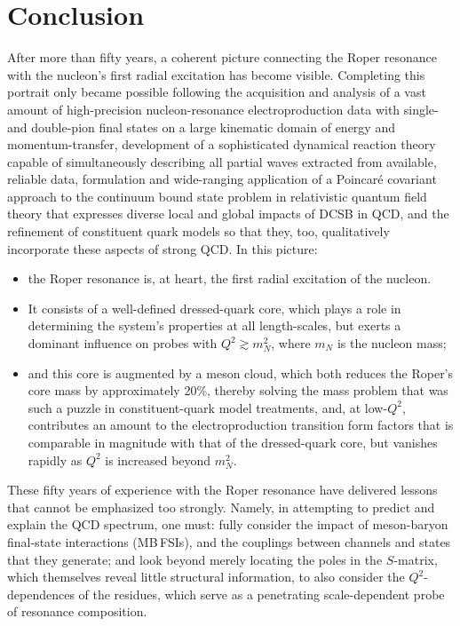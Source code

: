 \section{Conclusion}
%
After more than fifty years, a coherent picture connecting the Roper resonance with the nucleon's first radial excitation has become visible.  Completing this portrait only became possible following
%
the acquisition and analysis of a vast amount of high-precision nucleon-resonance electroproduction data with single- and double-pion final states on a large kinematic domain of energy and momentum-transfer,
%
development of a sophisticated dynamical reaction theory capable of simultaneously describing all partial waves extracted from available, reliable data,
%
formulation and wide-ranging application of a Poincar\'e covariant approach to the continuum bound state problem in relativistic quantum field theory that expresses diverse local and global impacts of DCSB in QCD,
%
and the refinement of constituent quark models so that they, too, qualitatively incorporate these aspects of strong QCD.
%
In this picture:
\begin{itemize}
\setlength\itemsep{0em}
\item the Roper resonance is, at heart, the first radial excitation of the nucleon.
\item It consists of a well-defined dressed-quark core, which plays a role in determining the system's properties at all length-scales, but exerts a dominant influence on probes with $Q^2\gtrsim m_N^2$, where $m_N$ is the nucleon mass;
\item and this core is augmented by a meson cloud, which both reduces the Roper's core mass by approximately 20\%, thereby solving the mass problem that was such a puzzle in constituent-quark model treatments, and, at low-$Q^2$, contributes an amount to the electroproduction transition form factors that is comparable in magnitude with that of the dressed-quark core, but vanishes rapidly as $Q^2$ is increased beyond $m_N^2$.
\end{itemize}

These fifty years of experience with the Roper resonance have delivered lessons that cannot be emphasized too strongly. Namely, in attempting to predict and explain the QCD spectrum, one must: fully consider the impact of meson-baryon final-state interactions (MB\,FSIs), and the couplings between channels and states that they generate; and look beyond merely locating the poles in the $S$-matrix, which themselves reveal little structural information, to also consider the $Q^2$-dependences of the residues, which serve as a penetrating scale-dependent probe of resonance composition.

